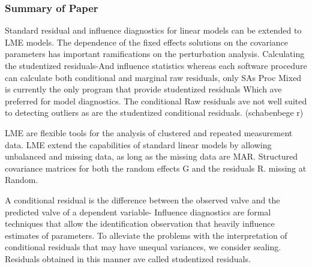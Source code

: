 \documentclass[12pt, a4paper]{report}
\theoremstyle{plain}
\theoremstyle{definition}
\theoremstyle{remark}
\begin{document}
	\subsubsection{Summary of Paper}
	Standard residual and influence diagnostics for linear models can be extended to LME models.
	The dependence of the fixed effects solutions on the covariance parameters has important ramifications on the perturbation analysis.	
	Calculating the studentized residuals-And influence statistics whereas each software procedure can calculate both conditional and marginal raw residuals, only SAs Proc Mixed is currently the only program that provide studentized residuals Which ave preferred for model diagnostics. The conditional Raw residuals ave not well suited to detecting outliers as are the studentized conditional residuals. (schabenbege r)
	
	
	LME are flexible tools for the analysis of clustered and repeated measurement data. LME extend the capabilities of standard linear models by allowing unbalanced and missing data, as long as the missing data are MAR. Structured covariance matrices for both the random effects G and the residuals R. missing at Random.
	
	A conditional residual is the difference between the observed valve and the predicted valve of a dependent variable- Influence diagnostics are formal techniques that allow the identification observation that heavily influence estimates of parameters.
	To alleviate the problems with the interpretation of conditional residuals that may have unequal variances, we consider sealing.
	Residuals obtained in this manner ave called studentized residuals.
	
\end{document}
